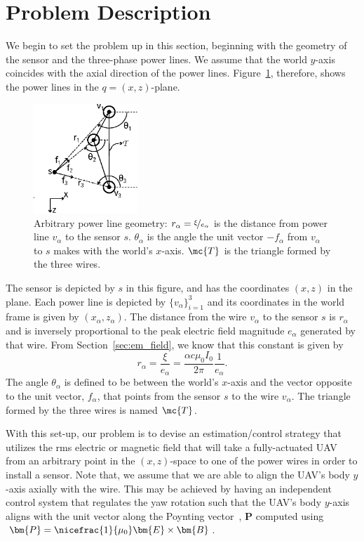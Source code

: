 \section{Problem Description}
\label{sec:description}

We begin to set the problem up in this section, beginning with the geometry of
the sensor and the three-phase power lines. We assume that the world $y$-axis
coincides with the axial direction of the power lines.
Figure~\ref{fig:geometry}, therefore, shows the power lines in the
$q=(x,z)$-plane.
%
\begin{figure}[tbh]
  \centering
  \includegraphics[width=0.35\textwidth]{./figures/general_power_line.eps}
  \caption{Arbitrary power line geometry: $r_\alpha = \nicefrac{\xi}{e_\alpha}$
  is the distance from power line $v_\alpha$ to the sensor $s$. $\theta_\alpha$
is the angle the unit vector $-f_\alpha$ from $v_\alpha$ to $s$ makes with the
world's $x$-axis. $\mc{T}$ is the triangle formed by the three wires.}
  \label{fig:geometry}
\end{figure}
%
The sensor is depicted by $s$ in this figure, and has the coordinates $(x, z)$
in the plane. Each power line is depicted by $\{v_\alpha\}_{i=1}^3$ and its
coordinates in the world frame is given by $(x_\alpha, z_\alpha)$. The distance
from the wire $v_\alpha$ to the sensor $s$ is $r_\alpha$ and is inversely
proportional to the peak electric field magnitude $e_\alpha$ generated by that
wire. From Section~\ref{sec:em_field}, we know that this constant is given by
%
\begin{equation}
    r_\alpha = \frac{\xi}{e_\alpha} = \frac{\alpha c \mu_0
I_0}{2\pi}\frac{1}{e_\alpha}.
\label{eq:xi_defn}
\end{equation}
%
The angle $\theta_\alpha$ is defined to be between the world's $x$-axis and the
vector opposite to the unit vector, $f_\alpha$, that points from the sensor $s$
to the wire $v_\alpha$. The triangle formed by the three wires is named
$\mc{T}$.

With this set-up, our problem is to devise an estimation/control strategy that
utilizes the rms electric or magnetic field that will take a fully-actuated UAV
from an arbitrary point in the $(x,z)$-space to one of the power wires in order
to install a sensor. Note that, we assume that we are able to align the UAV's
body $y$-axis axially with the wire. This may be achieved by having an
independent control system that regulates the yaw rotation such that the UAV's
body $y$-axis aligns with the unit vector along the Poynting vector~\cite{},
$\bm{P}$ computed using $\bm{P} = \nicefrac{1}{\mu_0}\bm{E} \times \bm{B}$.
